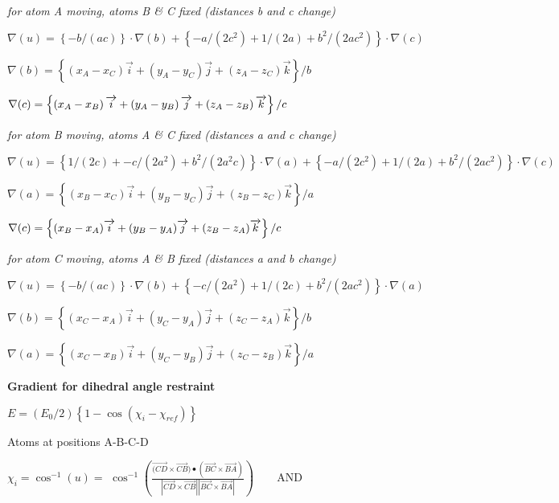 {\em for atom A moving, atoms B \& C fixed (distances b and c
change)}

$\nabla (u)=\left\{ -b/\left( ac\right) \right\} \cdot \nabla (b)+\left\{
-a/\left( 2c^{2}\right) +1/\left( 2a\right) +b^{2}/\left( 2ac^{2}\right)
\right\} \cdot \nabla (c)$

$\nabla (b)=\left\{ \left( x_{A}-x_{C}\right) \overrightarrow{i}+\left(
y_{A}-y_{C}\right) \overrightarrow{j}+\left( z_{A}-z_{C}\right) 
\overrightarrow{k}\right\} /b$

$\nabla (c)=\left\{ \left( x_{A}-x_{B}\right) \overrightarrow{i}+\left(
y_{A}-y_{B}\right) \overrightarrow{j}+\left( z_{A}-z_{B}\right) 
\overrightarrow{k}\right\} /c\medskip $

{\em for atom B moving, atoms A \& C fixed (distances a and c
change)}

$\nabla (u)=\left\{ 1/(2c)+-c/(2a^{2})+b^{2}/(2a^{2}c)\right\} \cdot \nabla
(a)+\left\{ -a/\left( 2c^{2}\right) +1/(2a)+b^{2}/\left( 2ac^{2}\right)
\right\} \cdot \nabla (c)$

$\nabla (a)=\left\{ (x_{B}-x_{C})\overrightarrow{i}+(y_{B}-y_{C})
\overrightarrow{j}+(z_{B}-z_{C})\overrightarrow{k}\right\} /a$

$\nabla (c)=\left\{ (x_{B}-x_{A})\overrightarrow{i}+(y_{B}-y_{A})
\overrightarrow{j}+(z_{B}-z_{A})\overrightarrow{k}\right\} /c\medskip $

{\em for atom C moving, atoms A \& B fixed (distances a and b
change)}

$\nabla (u)=\left\{ -b/\left( ac\right) \right\} \cdot \nabla (b)+\left\{
-c/\left( 2a^{2}\right) +1/(2c)+b^{2}/\left( 2ac^{2}\right) \right\} \cdot 
\nabla (a)$

$\nabla (b)=\left\{ (x_{C}-x_{A})\overrightarrow{i}+(y_{C}-y_{A})
\overrightarrow{j}+(z_{C}-z_{A})\overrightarrow{k}\right\} /b$

$\nabla (a)=\left\{ (x_{C}-x_{B})\overrightarrow{i}+(y_{C}-y_{B})
\overrightarrow{j}+(z_{C}-z_{B})\overrightarrow{k}\right\} /a $

{\bf Gradient for dihedral angle restraint}

$E=(E_{0}/2)\left\{ 1-\cos \left( \chi _{i}-\chi _{ref}\right) \right\} $

Atoms at positions A-B-C-D

$\chi _{i}=\cos ^{-1}(u)=$ $\cos ^{-1}\left( \frac{\overrightarrow{(CD}
\times \overrightarrow{CB})\bullet (\overrightarrow{BC}\times 
\overrightarrow{BA})}{\left| \overrightarrow{CD}\times \overrightarrow{CB}
\right| \left| \overrightarrow{BC}\times \overrightarrow{BA}\right| }\right)
\qquad $AND


